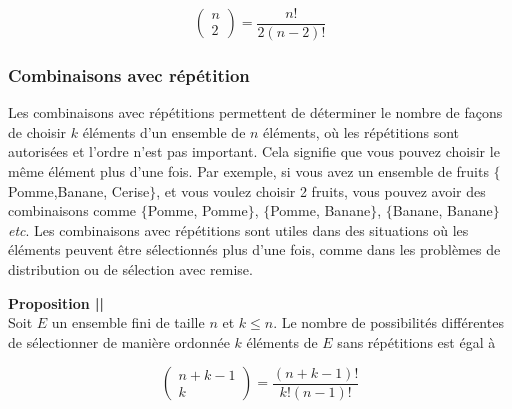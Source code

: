 \documentclass[12pt]{article}
\newif\ifcorrection
\newcommand{\corr}[1]{\ifcorrection{\color{lightblue}#1\color{black}}\fi}
\newcommand{\espace}{\vspace{1.5em}}
\newcommand{\petitespace}{\vspace{0.5cm}}
\newcounter{proposition}[subsection] %
\renewcommand{\theproposition}{\thesection|\thesubsection|\arabic{proposition}} %
\newcommand{\Prop}{\refstepcounter{proposition}\textbf{Proposition \theproposition} \\} %
\newcommand{\somme}[2]{\sum\limits_{#1}^{#2}}
\newcommand{\1}{\bb{1}} %
\begin{document}
$$\begin{pmatrix} n \\2 \end{pmatrix}  =  \frac{n!}{2(n-2)!}$$

\espace

\subsubsection{Combinaisons avec répétition}\espace

Les combinaisons avec répétitions permettent de déterminer le nombre de façons de choisir $k$ éléments d'un ensemble de $n$ éléments, où les répétitions sont autorisées et l'ordre n'est pas important. Cela signifie que vous pouvez choisir le même élément plus d'une fois. Par exemple, si vous avez un ensemble de fruits $\{$Pomme,Banane, Cerise$\}$, et vous voulez choisir 2 fruits, vous pouvez avoir des combinaisons comme $\{$Pomme, Pomme$\}$, $\{$Pomme, Banane$\}$, $\{$Banane, Banane$\}$ \textit{etc}. Les combinaisons avec répétitions sont utiles dans des situations où les éléments peuvent être sélectionnés plus d'une fois, comme dans les problèmes de distribution ou de sélection avec remise. \petitespace

\Prop
Soit $E$ un ensemble fini de taille $n$ et $k \le n$. Le nombre de possibilités différentes de sélectionner de manière ordonnée $k$ éléments de $E$ sans répétitions est égal à 

$$ \begin{pmatrix} n+k-1 \\k \end{pmatrix}=\frac{(n+k-1)!}{k!(n-1)!}$$
\petitespace

\corr{\textbf{Preuve :}

On pose $E = \{ x_1, \ldots, x_n \}$,  Nous voulons choisir $k$ éléments de $E$ avec répétitions autorisées, sans tenir compte de l'ordre. Cela revient à déterminer le nombre de d'ensemble différents de taille $k$ formés à partir des éléments de $E$, ou de manière équivalente, le nombre de solutions en entiers naturels de l'équation :

$$\somme{î=1}{n} X_i = k, \quad \text{$X_i \ge 0$ est le nombre de fois où $x_i$ est choisi} $$

Considérons $k*$ représentant les $k$ éléments choisis. Pour séparer ces étoiles en $n$ groupes (un groupe par élément de $E$), plaçons $n-1$ barres "|" entre les étoiles. Chaque groupe correspond au nombre d'occurrences d'un élément de $E$.

Par exemple, pour $n=3$ et $k=2$, la solution $X_1 = 1,X_2= 1,X_3 = 0$ est représentée *|*|. 

Chaque séquence de $k*$ et de $n-1$ "|" correspond à une unique solution de l'équation $\somme{î=1}{n} X_i = k$. Dans une telle séquence, il y a $n-1+k$ symbols. Le nombre de manières différentes de combiner ces symbols est le nombre de façons de choisir les positions des $k*$ parmi $n-1$ . Il s'agit d'une combinaison car les $k*$ et les |"" sont indistinguables, et donc il y a :

$$ \frac{(n+k-1)!}{k!(n-1)!} \quad \text{possibilités} $$


\petitespace}
\end{document}
